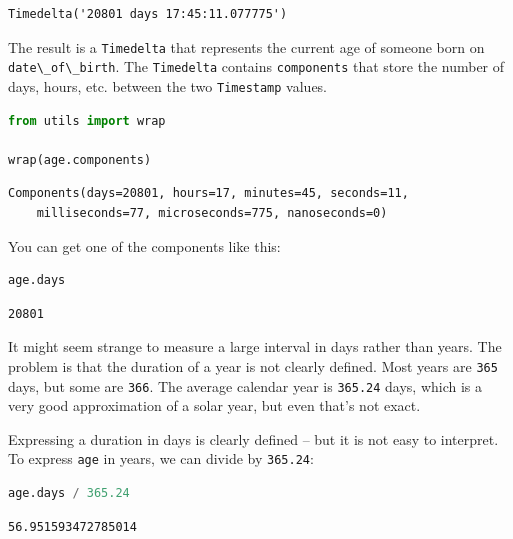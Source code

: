 \begin{lstlisting}[style=output]
Timedelta('20801 days 17:45:11.077775')
\end{lstlisting}

The result is a \passthrough{\lstinline!Timedelta!} that represents the
current age of someone born on
\passthrough{\lstinline!date\_of\_birth!}. The
\passthrough{\lstinline!Timedelta!} contains
\passthrough{\lstinline!components!} that store the number of days,
hours, etc. between the two \passthrough{\lstinline!Timestamp!} values.

\begin{lstlisting}[language=Python,style=source]
from utils import wrap

wrap(age.components)
\end{lstlisting}

\begin{lstlisting}[style=output]
Components(days=20801, hours=17, minutes=45, seconds=11,
    milliseconds=77, microseconds=775, nanoseconds=0)
\end{lstlisting}

You can get one of the components like this:

\begin{lstlisting}[language=Python,style=source]
age.days
\end{lstlisting}

\begin{lstlisting}[style=output]
20801
\end{lstlisting}

It might seem strange to measure a large interval in days rather than
years. The problem is that the duration of a year is not clearly
defined. Most years are \passthrough{\lstinline!365!} days, but some are
\passthrough{\lstinline!366!}. The average calendar year is
\passthrough{\lstinline!365.24!} days, which is a very good
approximation of a solar year, but even that's not exact.

Expressing a duration in days is clearly defined -- but it is not easy
to interpret. To express \passthrough{\lstinline!age!} in years, we can
divide by \passthrough{\lstinline!365.24!}:

\begin{lstlisting}[language=Python,style=source]
age.days / 365.24
\end{lstlisting}

\begin{lstlisting}[style=output]
56.951593472785014
\end{lstlisting}


